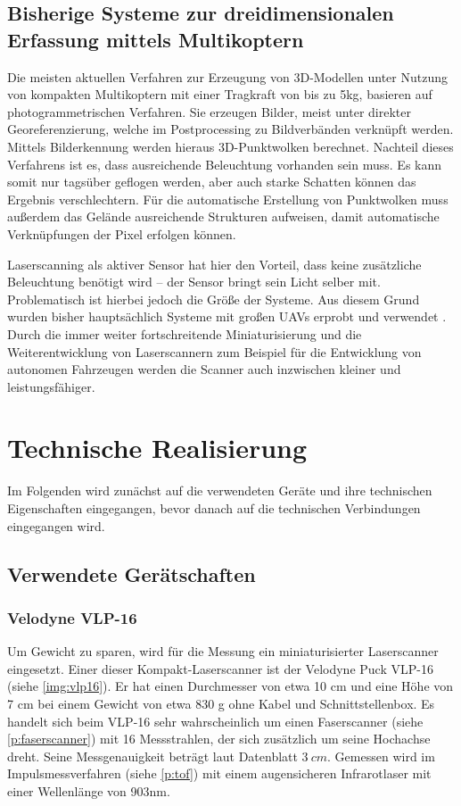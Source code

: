 \documentclass[a4paper,12pt,bibliography=totoc, listof=totoc,titlepage,pointlessnumbers]{scrreprt}
\begin{document}
\section{Bisherige Systeme zur dreidimensionalen Erfassung mittels Multikoptern}
Die meisten aktuellen Verfahren zur Erzeugung von 3D-Modellen unter Nutzung von kompakten Multikoptern mit einer Tragkraft von bis zu 5kg, basieren auf photogrammetrischen Verfahren. Sie erzeugen Bilder, meist unter direkter Georeferenzierung, welche im Postprocessing zu Bildverbänden verknüpft werden. Mittels Bilderkennung werden hieraus 3D-Punktwolken berechnet. Nachteil dieses Verfahrens ist es, dass ausreichende Beleuchtung vorhanden sein muss. Es kann somit nur tagsüber geflogen werden, aber auch starke Schatten können das Ergebnis verschlechtern. Für die automatische Erstellung von Punktwolken muss außerdem das Gelände ausreichende Strukturen aufweisen, damit automatische Verknüpfungen der Pixel erfolgen können.

Laserscanning als aktiver Sensor hat hier den Vorteil, dass keine zusätzliche Beleuchtung benötigt wird -- der Sensor bringt sein Licht selber mit. Problematisch ist hierbei jedoch die Größe der Systeme. Aus diesem Grund wurden bisher hauptsächlich Systeme mit großen UAVs erprobt und verwendet \citep[S. 19]{uav}. Durch die immer weiter fortschreitende Miniaturisierung und die Weiterentwicklung von Laserscannern zum Beispiel für die Entwicklung von autonomen Fahrzeugen werden die Scanner auch inzwischen kleiner und leistungsfähiger.


\chapter{Technische Realisierung}
\label{c:realisierung}


Im Folgenden wird zunächst auf die verwendeten Geräte und ihre technischen Eigenschaften eingegangen, bevor danach auf die technischen Verbindungen eingegangen wird.

\section {Verwendete Gerätschaften}

\subsection{Velodyne VLP-16}
\label{sss:vlp16}
Um Gewicht zu sparen, wird für die Messung ein miniaturisierter Laserscanner eingesetzt. Einer dieser Kompakt-Laserscanner ist der Velodyne Puck VLP-16 (siehe \autoref{img:vlp16}). Er hat einen Durchmesser von etwa 10 cm und eine Höhe von 7 cm bei einem Gewicht von etwa 830 g ohne Kabel und Schnittstellenbox. Es handelt sich beim VLP-16 sehr wahrscheinlich um einen Faserscanner (siehe \autoref{p:faserscanner}) mit 16 Messstrahlen, der sich zusätzlich um seine Hochachse dreht. Seine Messgenauigkeit beträgt laut Datenblatt \(3~cm\). Gemessen wird im Impulsmessverfahren (siehe \autoref{p:tof}) mit einem augensicheren Infrarotlaser mit einer Wellenlänge von 903nm. \citep{vlpSheet}
\end{document}
